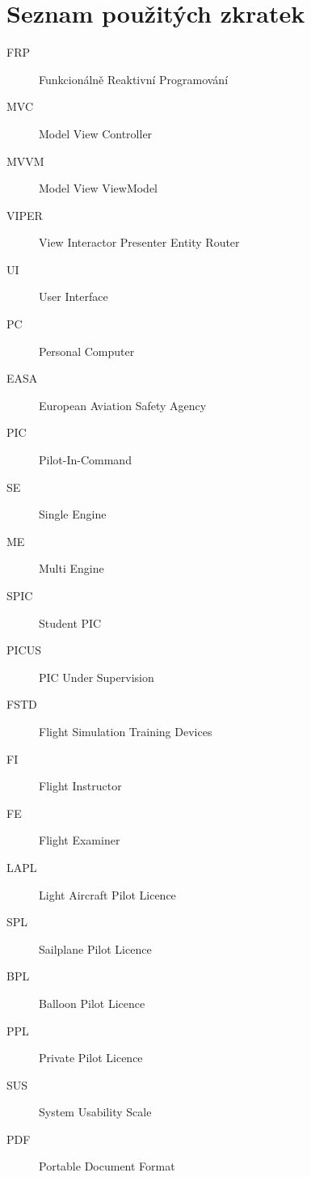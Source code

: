 \documentclass[thesis=M,czech]{FITthesis}[2012/06/26]
\begin{document}



\appendix

\chapter{Seznam použitých zkratek}
\begin{description}
	\item[FRP] Funkcionálně Reaktivní Programování
	\item[MVC] Model View Controller
	\item[MVVM] Model View ViewModel
	\item[VIPER] View Interactor Presenter Entity Router
	\item [UI] User Interface
	\item[PC] Personal Computer
	\item[EASA] European Aviation Safety Agency
	\item[PIC] Pilot-In-Command
	\item[SE] Single Engine
	\item[ME] Multi Engine
	\item[SPIC] Student PIC
	\item[PICUS] PIC Under Supervision
	\item[FSTD] Flight Simulation Training Devices
	\item[FI] Flight Instructor
	\item[FE] Flight Examiner
	\item[LAPL] Light Aircraft Pilot Licence
	\item[SPL] Sailplane Pilot Licence
	\item[BPL] Balloon Pilot Licence
	\item[PPL] Private Pilot Licence
	\item[SUS] System Usability Scale
	\item [PDF] Portable Document Format
\end{description}
\end{document}
